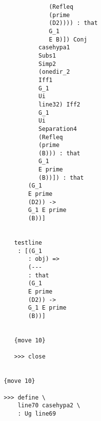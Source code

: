 \documentclass[12pt]{article}
\begin{document}
\begin{verbatim}
                                           (Refleq 
                                           (prime 
                                           (D2)))) : that 
                                           G_1 
                                           E B)]) Conj 
                                        casehypa1 
                                        Subs1 
                                        Simp2 
                                        (onedir_2 
                                        Iff1 
                                        G_1 
                                        Ui 
                                        line32) Iff2 
                                        G_1 
                                        Ui 
                                        Separation4 
                                        (Refleq 
                                        (prime 
                                        (B))) : that 
                                        G_1 
                                        E prime 
                                        (B))]) : that 
                                     (G_1 
                                     E prime 
                                     (D2)) -> 
                                     G_1 E prime 
                                     (B))]


                                 testline 
                                  : [(G_1 
                                     : obj) => 
                                     (--- 
                                     : that 
                                     (G_1 
                                     E prime 
                                     (D2)) -> 
                                     G_1 E prime 
                                     (B))]


                                 {move 10}

                                 >>> close


                              {move 10}

                              >>> define \
                                  line70 casehypa2 \
                                  : Ug line69



\end{verbatim}
\end{document}
